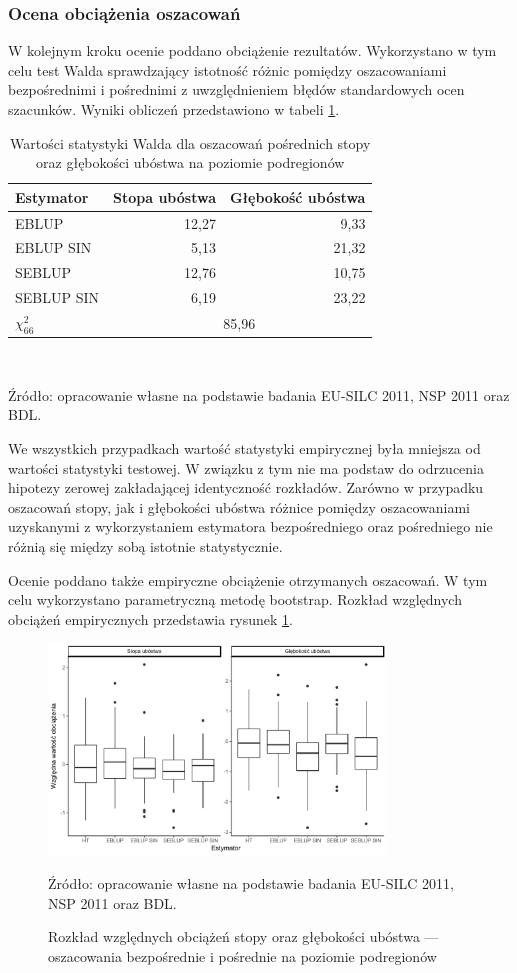 \subsubsection{Ocena obciążenia oszacowań}

W kolejnym kroku ocenie poddano obciążenie rezultatów. Wykorzystano w tym celu test Walda sprawdzający istotność różnic pomiędzy oszacowaniami bezpośrednimi i pośrednimi z uwzględnieniem błędów standardowych ocen szacunków. Wyniki obliczeń przedstawiono w tabeli \ref{tab:wald_podreg}.

\begin{table}[htp]
\caption{Wartości statystyki Walda dla oszacowań pośrednich stopy oraz głębokości ubóstwa na poziomie podregionów}
\label{tab:wald_podreg}
\begin{center}
\begin{tabular}{lrr}
\hline
Estymator & Stopa ubóstwa & Głębokość ubóstwa\tabularnewline
\hline
EBLUP & 12,27 & 9,33\tabularnewline
EBLUP SIN & 5,13 & 21,32\tabularnewline
SEBLUP & 12,76 & 10,75\tabularnewline
SEBLUP SIN & 6,19 & 23,22\tabularnewline
\hline
$\chi^2_{66}$ & \multicolumn{2}{c}{85,96}\tabularnewline
\hline
\end{tabular}\\
\end{center}
\small{Źródło: opracowanie własne na podstawie badania EU-SILC 2011, NSP 2011 oraz BDL.}
\end{table}

We wszystkich przypadkach wartość statystyki empirycznej była mniejsza od wartości statystyki testowej. W związku z tym nie ma podstaw do odrzucenia hipotezy zerowej zakładającej identyczność rozkładów. Zarówno w przypadku oszacowań stopy, jak i głębokości ubóstwa różnice pomiędzy oszacowaniami uzyskanymi z wykorzystaniem estymatora bezpośredniego oraz pośredniego nie różnią się między sobą istotnie statystycznie.

Ocenie poddano także empiryczne obciążenie otrzymanych oszacowań. W tym celu wykorzystano parametryczną metodę bootstrap. Rozkład względnych obciążeń empirycznych przedstawia rysunek \ref{fig:podreg_bias}.

\begin{figure}[htp]
\centering
\includegraphics[width=0.8\textwidth]{04_wykresy/fh_podreg_bias-1.pdf}
\caption{Rozkład względnych obciążeń stopy oraz głębokości ubóstwa --- oszacowania bezpośrednie i pośrednie na poziomie podregionów}
\small{Źródło: opracowanie własne na podstawie badania EU-SILC 2011, NSP 2011 oraz BDL.}
\label{fig:podreg_bias}
\end{figure}

